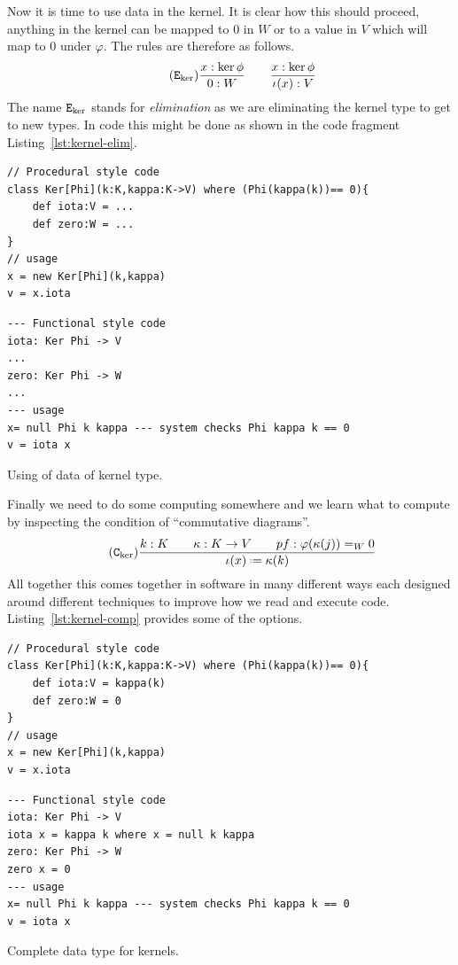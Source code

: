 \documentclass[12pt,twoside,dvipsnames,letterpaper]{memoir}
\begin{document}
Now it is time to use data in the kernel.  It is clear how this should 
proceed, anything in the kernel can be mapped to $0$ in $W$ or to a 
value in $V$ which will map to $0$ under $\varphi$.  The rules are therefore 
as follows.    
\begin{gather}
    \tag{$\elim{\ker}$}
    \frac{
        x:\ker\phi
    }{
        0:W
    }\qquad
    \frac{
        x:\ker\phi
    }{
        \iota(x):V
    }
\end{gather}
The name $\mathtt{E}_{\ker}$ stands for \emph{elimination} as we are eliminating 
the kernel type to get to new types.
In code this might be done as shown in the code fragment Listing~\ref{lst:kernel-elim}.
\begin{lstfloat}[!htbp]
\begin{lstlisting}[language=Sava]
// Procedural style code
class Ker[Phi](k:K,kappa:K->V) where (Phi(kappa(k))== 0){
    def iota:V = ...
    def zero:W = ...
}
// usage 
x = new Ker[Phi](k,kappa)
v = x.iota
\end{lstlisting}
\begin{lstlisting}[language=Hidris]
--- Functional style code
iota: Ker Phi -> V
...
zero: Ker Phi -> W
...
--- usage 
x= null Phi k kappa --- system checks Phi kappa k == 0
v = iota x
\end{lstlisting}    
\caption{Using of data of kernel type.}
\label{lst:kernel-elim}
\end{lstfloat}

Finally we need to do some computing somewhere and we learn 
what to compute by inspecting the condition of ``commutative diagrams''.
\begin{gather}
    \tag{$\comp{\ker}$}
    \frac{
        k:K\qquad \kappa:K\to V\qquad pf:\varphi(\kappa(j))=_W 0
    }{
        \iota(x) \defeq \kappa(k)
    }
\end{gather}
All together this comes together in software in many different ways 
each designed around different techniques to improve how we read and 
execute code.  Listing~\ref{lst:kernel-comp} provides some of the options.
\begin{lstfloat}[!htbp]
\begin{lstlisting}[language=Sava]
// Procedural style code
class Ker[Phi](k:K,kappa:K->V) where (Phi(kappa(k))== 0){
    def iota:V = kappa(k)
    def zero:W = 0
}
// usage 
x = new Ker[Phi](k,kappa)
v = x.iota
\end{lstlisting}
\begin{lstlisting}[language=Hidris]
--- Functional style code
iota: Ker Phi -> V
iota x = kappa k where x = null k kappa
zero: Ker Phi -> W
zero x = 0
--- usage 
x= null Phi k kappa --- system checks Phi kappa k == 0
v = iota x
\end{lstlisting}    
\caption{Complete data type for kernels.}
\label{lst:kernel-comp}
\end{lstfloat}
\end{document}
